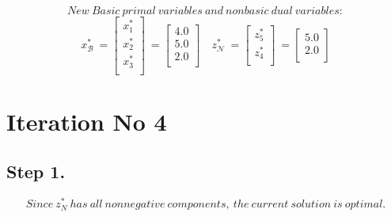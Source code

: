 \[
New\ Basic\ primal\ variables\ and\ nonbasic\ dual\ variables:
\]
\[
x_{\mathcal B}^{*}\ =\begin{bmatrix}
x_{1}^{*} \\x_{2}^{*} \\x_{3}^{*} \\
\end{bmatrix}\ =\begin{bmatrix}
4.0 \\ 5.0 \\ 2.0 \\ 
\end{bmatrix}\quad
z_{\mathcal N}^{*}\ =\begin{bmatrix}
z_{5}^{*} \\z_{4}^{*} \\
\end{bmatrix}\ =\begin{bmatrix}
5.0 \\ 2.0 \\ 
\end{bmatrix}
\]
\section*{Iteration No 4}
\subsection{Step 1.}
\[
Since\ z_\mathit{N}^*\ has\ all\ nonnegative\ components,\ the\ current\ solution\ is\ optimal.
\]
